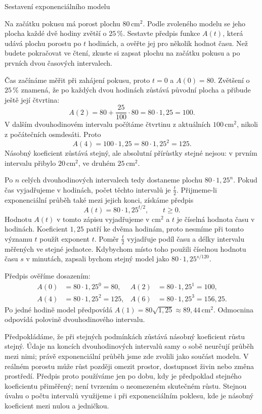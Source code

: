 \documentclass[12pt,a4paper]{article}
\begin{document}
\begin{examplebox}{Sestavení exponenciálního modelu}

Na začátku pokusu má porost plochu $80\,\mathrm{cm}^2$.
Podle zvoleného modelu se jeho plocha každé dvě hodiny zvětší o $25\,\%$.
Sestavte předpis funkce $A(t)$, která udává plochu porostu po $t$ hodinách,
a ověřte jej pro několik hodnot času.
Než budete pokračovat ve čtení, zkuste si zapsat plochu na začátku pokusu a po prvních dvou časových intervalech.

Čas začínáme měřit při zahájení pokusu, proto $t=0$ a $A(0)=80$.
Zvětšení o $25\,\%$ znamená, že po každých dvou hodinách zůstává původní plocha
a přibude ještě její čtvrtina:
\[
    A(2)=80+\frac{25}{100}\cdot80
        =80\cdot1{,}25=100.
\]
V dalším dvouhodinovém intervalu počítáme čtvrtinu z aktuálních $100\,\mathrm{cm}^2$,
nikoli z počátečních osmdesáti.
Proto
\[
    A(4)=100\cdot1{,}25
        =80\cdot1{,}25^2=125.
\]
Násobný koeficient zůstává stejný, ale absolutní přírůstky stejné nejsou:
v prvním intervalu přibylo $20\,\mathrm{cm}^2$, ve druhém $25\,\mathrm{cm}^2$.

Po $n$ celých dvouhodinových intervalech tedy dostaneme plochu $80\cdot1{,}25^n$.
Pokud čas vyjadřujeme v hodinách, počet těchto intervalů je $\frac{t}{2}$.
Přijmeme-li exponenciální průběh také mezi jejich konci, získáme předpis
\[
    A(t)=80\cdot1{,}25^{t/2},\qquad t\geq0.
\]
Hodnotu $A(t)$ v tomto zápisu vyjadřujeme v $\mathrm{cm}^2$ a $t$ je číselná hodnota času v hodinách.
Koeficient $1{,}25$ patří ke dvěma hodinám, proto nesmíme při tomto významu $t$ použít exponent $t$.
Poměr $\frac{t}{2}$ vyjadřuje podíl času a délky intervalu měřených ve stejné jednotce.
Kdybychom místo toho použili číselnou hodnotu času $s$ v minutách, zapsali bychom stejný model jako $80\cdot1{,}25^{s/120}$.

Předpis ověříme dosazením:
\[
\begin{aligned}
    A(0)&=80\cdot1{,}25^0=80, &
    A(2)&=80\cdot1{,}25^1=100,\\
    A(4)&=80\cdot1{,}25^2=125, &
    A(6)&=80\cdot1{,}25^3=156{,}25.
\end{aligned}
\]
Po jedné hodině model předpovídá
$A(1)=80\sqrt{1{,}25}\approx89{,}44\,\mathrm{cm}^2$.
Odmocnina odpovídá polovině dvouhodinového intervalu.

Předpokládáme, že při stejných podmínkách zůstává násobný koeficient růstu stejný.
Údaje na koncích dvouhodinových intervalů samy o sobě neurčují průběh mezi nimi;
právě exponenciální průběh jsme zde zvolili jako součást modelu.
V reálném porostu může růst později omezit prostor, dostupnost živin nebo změna prostředí.
Předpis proto používáme jen po dobu, kdy je předpoklad stejného koeficientu přiměřený;
není tvrzením o neomezeném skutečném růstu.
Stejnou úvahu o počtu intervalů využijeme i při exponenciálním poklesu,
kde je násobný koeficient mezi nulou a jedničkou.
\end{examplebox}
\end{document}
